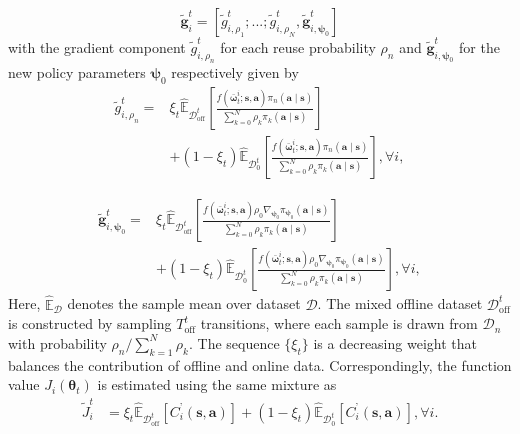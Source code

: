 \documentclass{IEEEtran}
\begin{document}
\begin{equation}
\tilde{\boldsymbol{g}}_{i}^{t}=\left[\tilde{g}_{i,\rho_{1}}^{t};...;\tilde{g}_{i,\rho_{N}}^{t},\tilde{\boldsymbol{g}}_{i,\boldsymbol{\psi}_{0}}^{t}\right]\label{eq:gtlt}
\end{equation}
with the gradient component $\tilde{g}_{i,\rho_{n}}^{t}$ for each reuse probability $\rho_{n}$ and $\tilde{\boldsymbol{g}}_{i,\boldsymbol{\psi}_{0}}^{t}$ for the new policy parameters $\boldsymbol{\psi}_{0}$ respectively given by
\begin{align}
\tilde{g}_{i,\rho_{n}}^{t}= & \xi_{t}\hat{\mathbb{E}}_{\mathcal{D}_{\text{off}}^{t}}\left[\frac{f\left(\bar{\boldsymbol{\omega}}_{t}^{i};\boldsymbol{s},\boldsymbol{a}\right)\pi_{n}\left(\boldsymbol{a}\mid\boldsymbol{s}\right)}{\sum_{k=0}^{N}\rho_{k}\pi_{k}\left(\boldsymbol{a}\mid\boldsymbol{s}\right)}\right]\label{eq:g-tilde-1}\\
& +\left(1-\xi_{t}\right)\hat{\mathbb{E}}_{\mathcal{D}_{0}^{t}}\left[\frac{f\left(\bar{\boldsymbol{\omega}}_{t}^{i};\boldsymbol{s},\boldsymbol{a}\right)\pi_{n}\left(\boldsymbol{a}\mid\boldsymbol{s}\right)}{\sum_{k=0}^{N}\rho_{k}\pi_{k}\left(\boldsymbol{a}\mid\boldsymbol{s}\right)}\right],\forall i,\nonumber
\end{align}

\begin{align}
\tilde{\boldsymbol{g}}_{i,\boldsymbol{\psi}_{0}}^{t}= & \xi_{t}\hat{\mathbb{E}}_{\mathcal{D}_{\text{off}}^{t}}\left[\frac{f\left(\bar{\boldsymbol{\omega}}_{t}^{i};\boldsymbol{s},\boldsymbol{a}\right)\rho_{0}\nabla_{\boldsymbol{\psi}_{0}}\pi_{\boldsymbol{\psi}_{0}}\left(\boldsymbol{a}\mid\boldsymbol{s}\right)}{\sum_{k=0}^{N}\rho_{k}\pi_{k}\left(\boldsymbol{a}\mid\boldsymbol{s}\right)}\right]\label{eq:g-tilde}\\
& +\left(1-\xi_{t}\right)\hat{\mathbb{E}}_{\mathcal{D}_{0}^{t}}\left[\frac{f\left(\bar{\boldsymbol{\omega}}_{t}^{i};\boldsymbol{s},\boldsymbol{a}\right)\rho_{0}\nabla_{\boldsymbol{\psi}_{0}}\pi_{\boldsymbol{\psi}_{0}}\left(\boldsymbol{a}\mid\boldsymbol{s}\right)}{\sum_{k=0}^{N}\rho_{k}\pi_{k}\left(\boldsymbol{a}\mid\boldsymbol{s}\right)}\right],\forall i,\nonumber
\end{align}
Here, $\hat{\mathbb{E}}_{\mathcal{D}}$ denotes the sample mean over dataset $\mathcal{D}$. The mixed offline dataset $\mathcal{D}_{\text{off}}^{t}$ is constructed by sampling $T_{\text{off}}^{t}$ transitions, where each sample is drawn from $\mathcal{D}_{n}$ with probability $\rho_{n}/\sum_{k=1}^{N}\rho_{k}$. The sequence $\{\xi_{t}\}$ is a decreasing weight that balances the contribution of offline and online data. Correspondingly, the function value $J_{i}(\boldsymbol{\theta}_{t})$ is estimated using the same mixture as
\begin{align}
\tilde{J}_{i}^{t} & =\xi_{t}\hat{\mathbb{E}}_{\mathcal{D}_{\text{off}}^{t}}\left[C_{i}^{\text{'}}(\boldsymbol{s},\boldsymbol{a})\right]+\left(1-\xi_{t}\right)\hat{\mathbb{E}}_{\mathcal{D}_{0}^{t}}\left[C_{i}^{\text{'}}(\boldsymbol{s},\boldsymbol{a})\right],\forall i.\label{eq:J-new}
\end{align}
\end{document}
